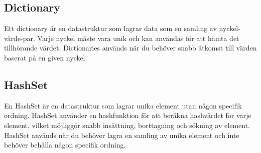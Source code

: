 \hypertarget{dictionary}{%
\subsection{Dictionary}\label{dictionary}}

Ett dictionary är en datastruktur som lagrar data som en samling av
nyckel-värde-par. Varje nyckel måste vara unik och kan användas för att
hämta det tillhörande värdet. Dictionaries används när du behöver snabb
åtkomst till värden baserat på en given nyckel.

\hypertarget{cb5}{}
\begin{Shaded}
\begin{Highlighting}[]
\OperatorTok{\textless{}}\OperatorTok{,} \OperatorTok{\textgreater{}}\OperatorTok{=}  \OperatorTok{\textless{}\textgreater{}();}
\OperatorTok{(}\OperatorTok{,} \OperatorTok{);}
\OperatorTok{(}\OperatorTok{,} \OperatorTok{);}
\OperatorTok{(}\OperatorTok{,} \OperatorTok{);}
\OperatorTok{(}\OperatorTok{(}\OperatorTok{));}  
\end{Highlighting}
\end{Shaded}

\hypertarget{hashset}{%
\subsection{HashSet}\label{hashset}}

En HashSet är en datastruktur som lagrar unika element utan någon
specifik ordning. HashSet använder en hashfunktion för att beräkna
hashvärdet för varje element, vilket möjliggör snabb insättning,
borttagning och sökning av element. HashSet används när du behöver lagra
en samling av unika element och inte behöver behålla någon specifik
ordning.

